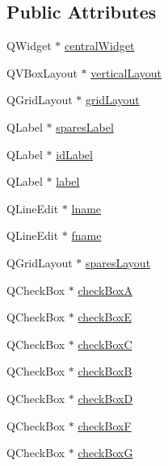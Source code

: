 \subsection*{Public Attributes}
\begin{DoxyCompactItemize}
\item 
Q\+Widget $\ast$ \hyperlink{class_ui___student_window_a03ee1cc84f4bf0a9ca3153af7de479fc}{central\+Widget}
\item 
Q\+V\+Box\+Layout $\ast$ \hyperlink{class_ui___student_window_a5e13b0cf94d07e28771f59bdfe9e46e2}{vertical\+Layout}
\item 
Q\+Grid\+Layout $\ast$ \hyperlink{class_ui___student_window_a4713e1a37dde716e76e17845da031746}{grid\+Layout}
\item 
Q\+Label $\ast$ \hyperlink{class_ui___student_window_af8d90aee0ee822ed32f2c33ed572c9b3}{spares\+Label}
\item 
Q\+Label $\ast$ \hyperlink{class_ui___student_window_af41e0c4f101c2a69f905a293377ef68c}{id\+Label}
\item 
Q\+Label $\ast$ \hyperlink{class_ui___student_window_a98c3a2667ccd18fe555f842a20667ebf}{label}
\item 
Q\+Line\+Edit $\ast$ \hyperlink{class_ui___student_window_a9835fd47b2b8a7d0f47091b5d243aa3c}{lname}
\item 
Q\+Line\+Edit $\ast$ \hyperlink{class_ui___student_window_aa1466412f323fed36c1de47d0fc28128}{fname}
\item 
Q\+Grid\+Layout $\ast$ \hyperlink{class_ui___student_window_a1dcada1d3e4c870348c466990f468b45}{spares\+Layout}
\item 
Q\+Check\+Box $\ast$ \hyperlink{class_ui___student_window_a26ea879890d5a5949fcf5a00fbc5e3d0}{check\+BoxA}
\item 
Q\+Check\+Box $\ast$ \hyperlink{class_ui___student_window_a1e785032dde2e5fd810b09b357d903c1}{check\+BoxE}
\item 
Q\+Check\+Box $\ast$ \hyperlink{class_ui___student_window_a64647de7ae0013093f1f038403f7f2e7}{check\+BoxC}
\item 
Q\+Check\+Box $\ast$ \hyperlink{class_ui___student_window_a8c978f0bca3152b4f06f25102805a8b6}{check\+BoxB}
\item 
Q\+Check\+Box $\ast$ \hyperlink{class_ui___student_window_a44ee83b383f062ed58861f1882d7d8b2}{check\+BoxD}
\item 
Q\+Check\+Box $\ast$ \hyperlink{class_ui___student_window_a31b24b6809344b69ecb0b963a18356c3}{check\+BoxF}
\item 
Q\+Check\+Box $\ast$ \hyperlink{class_ui___student_window_a0b7b708826e161415ffa5a83313221a7}{check\+BoxG}

\end{DoxyCompactItemize}

